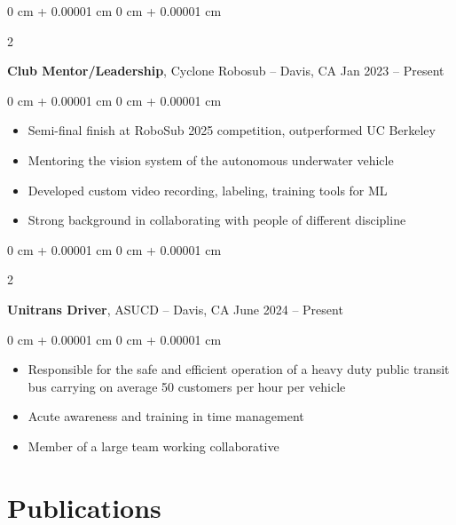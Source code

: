 \documentclass[10pt, letterpaper]{article}
\newenvironment{highlights}{
    \begin{itemize}[
        topsep=0.10 cm,
        parsep=0.10 cm,
        partopsep=0pt,
        itemsep=0pt,
        leftmargin=0 cm + 10pt
    ]
}{
    \end{itemize}
} %
\newenvironment{onecolentry}{
    \begin{adjustwidth}{
        0 cm + 0.00001 cm
    }{
        0 cm + 0.00001 cm
    }
}{
    \end{adjustwidth}
} %
\newenvironment{twocolentry}[2][]{
    \onecolentry
    \def\secondColumn{#2}
    \setcolumnwidth{\fill, 6 cm}
    \begin{paracol}{2}
}{
    \switchcolumn \raggedleft \secondColumn
    \end{paracol}
    \endonecolentry
} %
\begin{document}
        \vspace{0.2 cm}

        \begin{twocolentry}{
            Jan 2023 – Present
        }
            \textbf{Club Mentor/Leadership}, Cyclone Robosub -- Davis, CA\end{twocolentry}

        \vspace{0.10 cm}
        \begin{onecolentry}
            \begin{highlights}
                \item Semi-final finish at RoboSub 2025 competition, outperformed UC Berkeley
                \item Mentoring the vision system of the autonomous underwater vehicle
                \item Developed custom video recording, labeling, training tools for ML 
                \item Strong background in collaborating with people of different discipline

            \end{highlights}
        \end{onecolentry}


        \vspace{0.2 cm}

        \begin{twocolentry}{
            June 2024 – Present
        }
            \textbf{Unitrans Driver}, ASUCD -- Davis, CA\end{twocolentry}

        \vspace{0.10 cm}
        \begin{onecolentry}
            \begin{highlights}
                \item Responsible for the safe and efficient operation of a heavy duty public transit bus carrying on average 50 customers per hour per vehicle
                \item Acute awareness and training in time management
                \item Member of a large team working collaborative

            \end{highlights}
        \end{onecolentry}



    
    \section{Publications}
\end{document}
